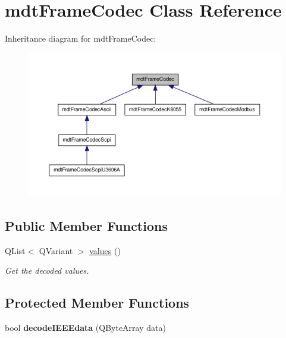 \hypertarget{classmdt_frame_codec}{
\section{mdtFrameCodec Class Reference}
\label{classmdt_frame_codec}
}


Inheritance diagram for mdtFrameCodec:\nopagebreak
\begin{figure}[H]
\begin{center}
\leavevmode
\includegraphics[width=400pt]{classmdt_frame_codec__inherit__graph}
\end{center}
\end{figure}
\subsection*{Public Member Functions}
\begin{DoxyCompactItemize}
\item 
\hypertarget{classmdt_frame_codec_a599a46e2d7cb5f80bd80e303236ead73}{
QList$<$ QVariant $>$ \hyperlink{classmdt_frame_codec_a599a46e2d7cb5f80bd80e303236ead73}{values} ()}
\label{classmdt_frame_codec_a599a46e2d7cb5f80bd80e303236ead73}

\begin{DoxyCompactList}\small\item\em Get the decoded values. \end{DoxyCompactList}\end{DoxyCompactItemize}
\subsection*{Protected Member Functions}
\begin{DoxyCompactItemize}
\item 
\hypertarget{classmdt_frame_codec_a6a47e1739b13c72883a01f5dd4bcffb6}{
bool {\bfseries decodeIEEEdata} (QByteArray data)}
\label{classmdt_frame_codec_a6a47e1739b13c72883a01f5dd4bcffb6}

\end{DoxyCompactItemize}
